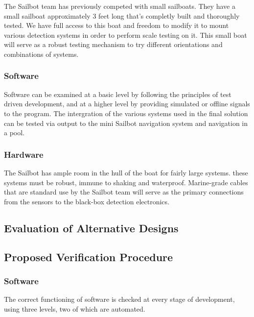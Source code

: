 The Sailbot team has previously competed with small sailboats. They have a small sailboat approximately 3 feet long that's completly built and thoroughly tested. We have full access to this boat and freedom to modify it to mount various detection systems in order to perform scale testing on it. This small boat will serve as a robust testing mechanism to try different orientations and combinations of systems.

\subsubsection{\label{sec:method:proposed-analysis:software}Software}
Software can be examined at a basic level by following the principles of test driven development, and at a higher level by providing simulated or offline signals to the program. The intergration of the various systems used in the final solution can be tested via output to the mini Sailbot navigation system and navigation in a pool.

\subsubsection{\label{sec:method:proposed-analysis:hardware}Hardware}
The Sailbot has ample room in the hull of the boat for fairly large systems. these systems must be robust, immune to shaking and waterproof. Marine-grade cables that are standard use by the Sailbot team will serve as the primary connections from the sensors to the black-box detection electronics.


\subsection{\label{sec:method:evaluation-of-alternative-designs}Evaluation of Alternative Designs}

\subsection{\label{sec:method:proposed-verification-procedure}Proposed Verification Procedure}

\subsubsection{\label{sec:method:proposed-verification-procedure:software}Software}
The correct functioning of software is checked at every stage of development, using three levels, two of which are automated.

